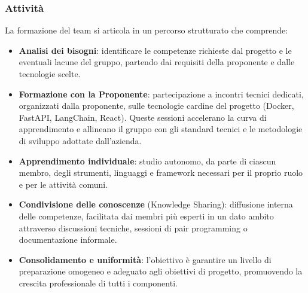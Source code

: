 \subsubsection{Attività}
La formazione del team si articola in un percorso strutturato che comprende:
\begin{itemize}[itemsep=3pt, parsep=1pt, label=$\scriptstyle\bullet$]
    \item \textbf{Analisi dei bisogni}: identificare le competenze richieste dal progetto e le eventuali lacune del gruppo, partendo dai requisiti della proponente e dalle tecnologie scelte.
    \item \textbf{Formazione con la Proponente}: partecipazione a incontri tecnici dedicati, organizzati dalla proponente, sulle tecnologie cardine del progetto (Docker, FastAPI, LangChain, React). Queste sessioni accelerano la curva di apprendimento e allineano il gruppo con gli standard tecnici e le metodologie di sviluppo adottate dall'azienda.
    \item \textbf{Apprendimento individuale}: studio autonomo, da parte di ciascun membro, degli strumenti, linguaggi e framework necessari per il proprio ruolo e per le attività comuni.
    \item \textbf{Condivisione delle conoscenze} (Knowledge Sharing): diffusione interna delle competenze, facilitata dai membri più esperti in un dato ambito attraverso discussioni tecniche, sessioni di pair programming o documentazione informale.
    \item \textbf{Consolidamento e uniformità}: l'obiettivo è garantire un livello di preparazione omogeneo e adeguato agli obiettivi di progetto, promuovendo la crescita professionale di tutti i componenti.
\end{itemize}

